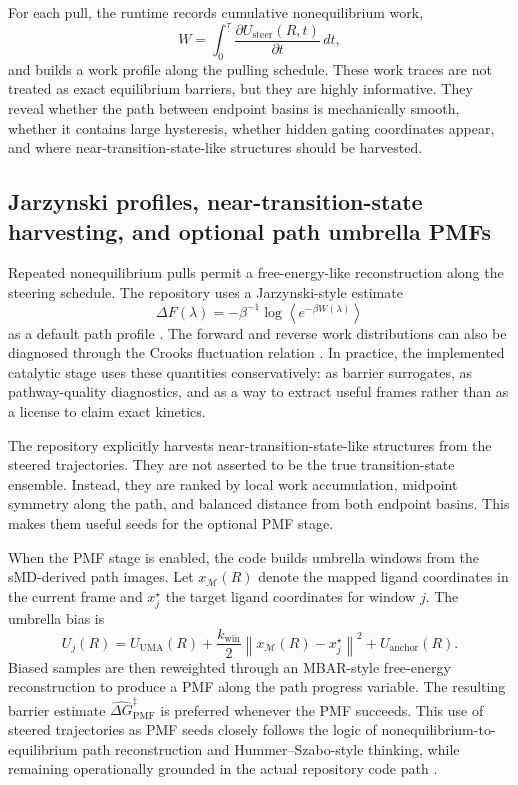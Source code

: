 \documentclass[11pt]{article}
\begin{document}
	For each pull, the runtime records cumulative nonequilibrium work,
	\begin{equation}
		W = \int_0^\tau \frac{\partial U_{\mathrm{steer}}(R,t)}{\partial t}\,dt,
	\end{equation}
	and builds a work profile along the pulling schedule. These work traces are not treated as exact equilibrium barriers, but they are highly informative. They reveal whether the path between endpoint basins is mechanically smooth, whether it contains large hysteresis, whether hidden gating coordinates appear, and where near-transition-state-like structures should be harvested.
	
	\subsection{Jarzynski profiles, near-transition-state harvesting, and optional path umbrella PMFs}
	
	Repeated nonequilibrium pulls permit a free-energy-like reconstruction along the steering schedule. The repository uses a Jarzynski-style estimate
	\begin{equation}
		\Delta F(\lambda)
		=
		-\beta^{-1}\log
		\left\langle
		e^{-\beta W(\lambda)}
		\right\rangle
	\end{equation}
	as a default path profile \citep{jarzynski1997nonequilibrium}. The forward and reverse work distributions can also be diagnosed through the Crooks fluctuation relation \citep{crooks1999entropy}. In practice, the implemented catalytic stage uses these quantities conservatively: as barrier surrogates, as pathway-quality diagnostics, and as a way to extract useful frames rather than as a license to claim exact kinetics.
	
	The repository explicitly harvests near-transition-state-like structures from the steered trajectories. They are not asserted to be the true transition-state ensemble. Instead, they are ranked by local work accumulation, midpoint symmetry along the path, and balanced distance from both endpoint basins. This makes them useful seeds for the optional PMF stage.
	
	When the PMF stage is enabled, the code builds umbrella windows from the sMD-derived path images. Let $x_{\mathcal{M}}(R)$ denote the mapped ligand coordinates in the current frame and $x_j^\star$ the target ligand coordinates for window $j$. The umbrella bias is
	\begin{equation}
		U_j(R)=U_{\mathrm{UMA}}(R)+\frac{k_{\mathrm{win}}}{2}\left\|x_{\mathcal{M}}(R)-x_j^\star\right\|^2+U_{\mathrm{anchor}}(R).
	\end{equation}
	Biased samples are then reweighted through an MBAR-style free-energy reconstruction to produce a PMF along the path progress variable. The resulting barrier estimate $\widehat{\Delta G}_{\mathrm{PMF}}^\ddagger$ is preferred whenever the PMF succeeds. This use of steered trajectories as PMF seeds closely follows the logic of nonequilibrium-to-equilibrium path reconstruction and Hummer--Szabo-style thinking, while remaining operationally grounded in the actual repository code path \citep{hummer2001free}.
	
\end{document}
